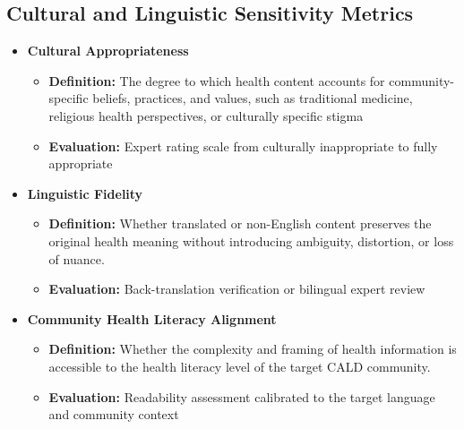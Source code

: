 \documentclass[]{article}
\begin{document}
\subsection{Cultural and Linguistic Sensitivity Metrics}

\begin{itemize}
\item
  \textbf{Cultural Appropriateness}

  \begin{itemize}
  \item
    \textbf{Definition:} The degree to which health content accounts for
    community-specific beliefs, practices, and values, such as
    traditional medicine, religious health perspectives, or culturally
    specific stigma
  \item
    \textbf{Evaluation:} Expert rating scale from culturally
    inappropriate to fully appropriate
  \end{itemize}
\item
  \textbf{Linguistic Fidelity}

  \begin{itemize}
  \item
    \textbf{Definition:} Whether translated or non-English content
    preserves the original health meaning without introducing ambiguity,
    distortion, or loss of nuance.
  \item
    \textbf{Evaluation:} Back-translation verification or bilingual
    expert review
  \end{itemize}
\item
  \textbf{Community Health Literacy Alignment}

  \begin{itemize}
  \item
    \textbf{Definition:} Whether the complexity and framing of health
    information is accessible to the health literacy level of the target
    CALD community.
  \item
    \textbf{Evaluation:} Readability assessment calibrated to the target
    language and community context
  \end{itemize}
\end{itemize}
\end{document}
